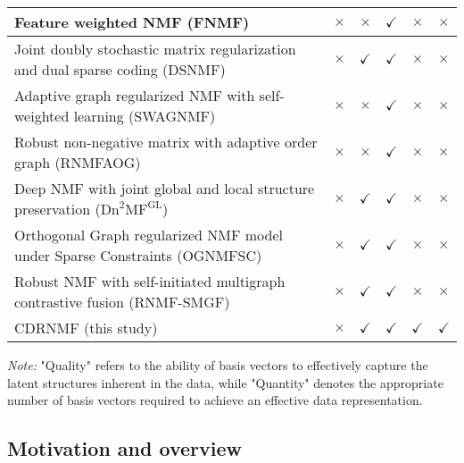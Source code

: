 \documentclass[a4paper,fleqn]{cas-sc}
\begin{document}
\begin{table}[ht]
{\begin{tabular}{p{6cm} c c c c c}
		\hline
		Feature weighted NMF (FNMF) \cite{27} & \(\times\) & \(\times\) & \(\checkmark\) & \(\times\) & \(\times\) \\
		\hline
		Joint doubly stochastic matrix regularization and dual sparse coding (DSNMF) \cite{22} & \(\times\) & \(\checkmark\) & \(\checkmark\) & \(\times\) & \(\times\) \\
		\hline
		Adaptive graph regularized NMF with self-weighted learning (SWAGNMF) \cite{21} & \(\times\) & \(\times\) & \(\checkmark\) & \(\times\) & \(\times\) \\
		\hline
		Robust non-negative matrix with adaptive order graph (RNMFAOG) \cite{18} & \(\times\) & \(\times\) & \(\checkmark\) & \(\times\) & \(\times\) \\
		\hline
		Deep NMF with joint global and local structure preservation ($\text{Dn}^2\text{MF}^{\text{GL}}$) \cite{23} & \(\times\) & \(\checkmark\) & \(\checkmark\) & \(\times\) & \(\times\) \\
		\hline
		Orthogonal Graph regularized NMF model under Sparse Constraints (OGNMFSC) \cite{60} & \(\times\) & \(\checkmark\) & \(\checkmark\) & \(\times\) & \(\times\) \\
		\hline
		Robust NMF with self-initiated multigraph contrastive fusion (RNMF-SMGF) \cite{61} & \(\times\) & \(\checkmark\) & \(\checkmark\) & \(\times\) & \(\times\) \\
		\hline
		CDRNMF (this study) & \(\times\) & \(\checkmark\) & \(\checkmark\) & \(\checkmark\) & \(\checkmark\) \\
		\bottomrule
	\end{tabular}
	\label{tab:summary}
	\begin{flushleft}
		\textit{Note:} "Quality" refers to the ability of basis vectors to effectively capture the latent structures inherent in the data, while "Quantity" denotes the appropriate number of basis vectors required to achieve an effective data representation.
	\end{flushleft}
}
\end{table}



\subsection{Motivation and overview}
\end{document}
